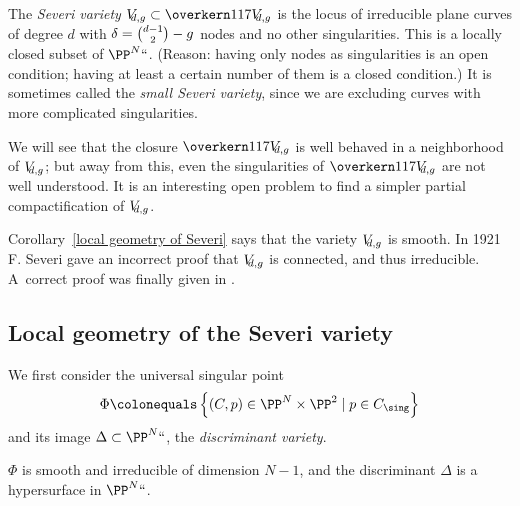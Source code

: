 \begin{definition}
The \emph{Severi variety}
%
$\Vdg \subset \Vdgbar$ is the locus of irreducible plane curves of
%
degree $d$ with $\delta = \tbinom{d-1}{2} - g$ nodes and no other
singularities. This is a locally closed subset of $\PP^N` `$.
(Reason: having only nodes as singularities is an open condition; having at least a certain number of them
is a closed condition.)
It is sometimes
%
called the \emph{small Severi variety}, since we are excluding curves with more complicated singularities.
\end{definition}

We will see that the closure $\Vdgbar$ is well behaved in a
neighborhood of $\Vdg$; but away from this, even the singularities
of $\Vdgbar$ are not well understood. It
is an interesting open
problem to find a simpler partial compactification of $ \Vdg$.

\begin{fact}\label{severi irreducible}
Corollary~\ref{local geometry of Severi} says that
the variety $\Vdg$ is smooth. In 1921 F. Severi gave an incorrect
proof
that $\Vdg$ is
connected, and thus irreducible.
%
%
A~correct proof was finally given in \cite{MR837522}.
\end{fact}


\subsection*{Local geometry of the Severi variety}

We first consider the
%
universal singular point
$$
\Phi \colonequals  \left\{ (C, p) \in \PP^N \times \PP^2 \mid p \in C_{\sing} \right\}
$$
and its image $\Delta\subset \PP^N` `$, the \emph{discriminant variety}.
%

\begin{proposition}
\label{local severi geometry}
 $\Phi$
is smooth and irreducible of dimension $N-1$,
and the discriminant $\Delta$ is a hypersurface in $\PP^N` `$.
\unif
\end{proposition}

